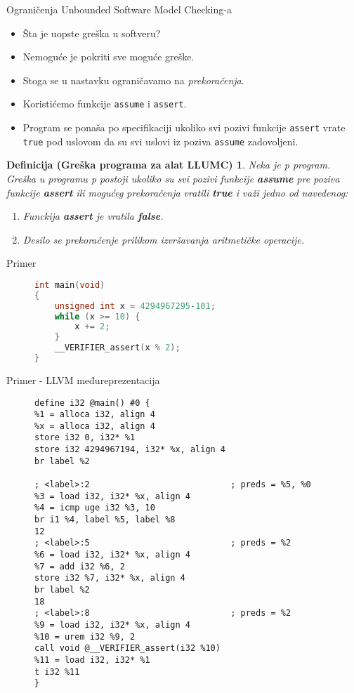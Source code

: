 \documentclass{beamer}
\begin{document}
\begin{frame}{Ograničenja Unbounded Software Model Checking-a}
    \begin{itemize}
        \item Šta je uopste greška u softveru?
        \item Nemoguće je pokriti sve moguće greške.
        \item Stoga se u nastavku ograničavamo na \emph{prekoračenja}.
        \item Koristićemo funkcije \texttt{assume} i \texttt{assert}.
        \item Program se ponaša po specifikaciji ukoliko svi pozivi funkcije \texttt{assert} vrate \texttt{true} pod uslovom da su svi uslovi iz poziva \texttt{assume} zadovoljeni.
    \end{itemize}
    \newtheorem{definicija}{Definicija (Greška programa za alat LLUMC)}
    \begin{definicija}
        Neka je p program. Greška u programu p postoji ukoliko su svi pozivi funkcije \textbf{assume} pre poziva funkcije \textbf{assert} ili mogućeg prekoračenja vratili \textbf{true} i važi jedno od navedenog:
        \begin{enumerate}
            \item Funckija \textbf{assert} je vratila \textbf{false}.
            \item Desilo se prekoračenje prilikom izvršavanja aritmetičke operacije.
        \end{enumerate}
    \end{definicija}
\end{frame}

\begin{frame}[fragile]{Primer}
    \begin{figure}[!h]
        \centering
\begin{lstlisting}[language=C]
int main(void)
{
    unsigned int x = 4294967295-101;
    while (x >= 10) {
        x += 2;
    }
    __VERIFIER_assert(x % 2);
}
\end{lstlisting}
    \end{figure}
\end{frame}

\begin{frame}[fragile]{Primer - LLVM međureprezentacija}
    \begin{figure}[!h]
        \centering
\begin{lstlisting}[basicstyle=\tiny]
define i32 @main() #0 {
%1 = alloca i32, align 4
%x = alloca i32, align 4
store i32 0, i32* %1
store i32 4294967194, i32* %x, align 4
br label %2

; <label>:2                            ; preds = %5, %0
%3 = load i32, i32* %x, align 4
%4 = icmp uge i32 %3, 10
br i1 %4, label %5, label %8
12
; <label>:5                            ; preds = %2
%6 = load i32, i32* %x, align 4
%7 = add i32 %6, 2
store i32 %7, i32* %x, align 4
br label %2
18
; <label>:8                            ; preds = %2
%9 = load i32, i32* %x, align 4
%10 = urem i32 %9, 2
call void @__VERIFIER_assert(i32 %10)
%11 = load i32, i32* %1
t i32 %11
}
\end{lstlisting}
\end{figure}
\end{frame}
\end{document}
